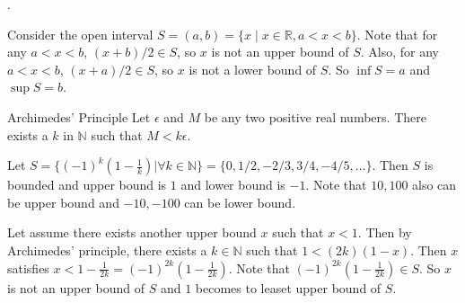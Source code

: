 \documentclass[8pt]{beamer}
\newcommand{\mbb}[1]{\mathbb{#1}}
\begin{document}
\begin{frame}{.}
    \begin{example}
        Consider the open interval $S = (a,b) = \{x \mid x \in \mbb{R}, a < x < b\}$.
        Note that for any $a<x<b$, $(x+b)/2 \in S$, so $x$ is not an upper bound of $S$.
        Also, for any $a<x<b$, $(x+a)/2 \in S$, so $x$ is not a lower bound of $S$.
        So $\inf S = a$ and $\sup S = b$.
    \end{example}


    \begin{block}{Archimedes' Principle}
        Let $\epsilon$ and $M$ be any two positive real numbers.
        There exists a $k$ in $\mbb{N}$ such that $M < k \epsilon$.
    \end{block}

    \begin{example}
        Let $S = \{(-1)^k \left(1 - \frac{1}{k}\right) | \forall k \in \mbb{N} \} = \{0, 1/2, -2/3, 3/4, -4/5, \dots\}$.
        Then $S$ is bounded and upper bound is $1$ and lower bound is $-1$.
        Note that $10, 100$ also can be upper bound and $-10, -100$ can be lower bound.

        Let assume there exists another upper bound $x$ such that $x < 1$.
        Then by Archimedes' principle, there exists a $k \in \mbb{N}$ such that $1 < (2k)(1-x)$.
        Then $x$ satisfies $x < 1 - \frac{1}{2k} = (-1)^{2k} (1 - \frac{1}{2k})$.
        Note that $(-1)^{2k} (1 - \frac{1}{2k}) \in S$.
        So $x$ is not an upper bound of $S$ and $1$ becomes to leaset upper bound of $S$.
    \end{example}
\end{frame}
\end{document}
